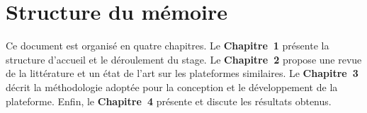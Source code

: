 \section{Structure du mémoire}

Ce document est organisé en quatre chapitres. Le \textbf{Chapitre~1} présente la structure d'accueil et le déroulement du stage. Le \textbf{Chapitre~2} propose une revue de la littérature et un état de l'art sur les plateformes similaires. Le \textbf{Chapitre~3} décrit la méthodologie adoptée pour la conception et le développement de la plateforme. Enfin, le \textbf{Chapitre~4} présente et discute les résultats obtenus.
